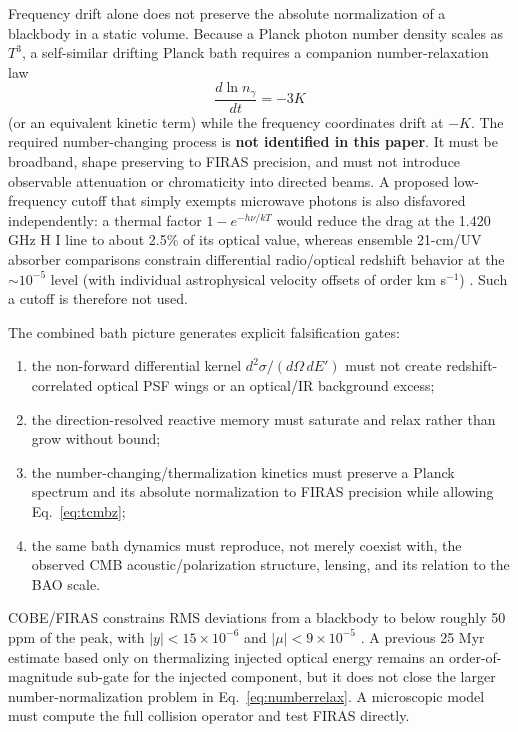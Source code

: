\documentclass[11pt]{article}
\begin{document}
Frequency drift alone does not preserve the absolute normalization of a blackbody in a static volume. Because a Planck photon number density scales as $T^3$, a self-similar drifting Planck bath requires a companion number-relaxation law
\begin{equation}
 \frac{d\ln n_\gamma}{dt}=-3K
 \label{eq:numberrelax}
\end{equation}
(or an equivalent kinetic term) while the frequency coordinates drift at $-K$. The required number-changing process is \textbf{not identified in this paper}. It must be broadband, shape preserving to FIRAS precision, and must not introduce observable attenuation or chromaticity into directed beams. A proposed low-frequency cutoff that simply exempts microwave photons is also disfavored independently: a thermal factor $1-e^{-h\nu/kT}$ would reduce the drag at the 1.420 GHz H I line to about 2.5\% of its optical value, whereas ensemble 21-cm/UV absorber comparisons constrain differential radio/optical redshift behavior at the $\sim10^{-5}$ level (with individual astrophysical velocity offsets of order km s$^{-1}$) \citep{Tzanavaris2007}. Such a cutoff is therefore not used.

The combined bath picture generates explicit falsification gates:
\begin{enumerate}[label=(\roman*)]
\item the non-forward differential kernel $d^2\sigma/(d\Omega\,dE')$ must not create redshift-correlated optical PSF wings or an optical/IR background excess;
\item the direction-resolved reactive memory must saturate and relax rather than grow without bound;
\item the number-changing/thermalization kinetics must preserve a Planck spectrum and its absolute normalization to FIRAS precision while allowing Eq.~\eqref{eq:tcmbz};
\item the same bath dynamics must reproduce, not merely coexist with, the observed CMB acoustic/polarization structure, lensing, and its relation to the BAO scale.
\end{enumerate}

COBE/FIRAS constrains RMS deviations from a blackbody to below roughly 50 ppm of the peak, with $|y|<15\times10^{-6}$ and $|\mu|<9\times10^{-5}$ \citep{Fixsen1996}. A previous 25 Myr estimate based only on thermalizing injected optical energy remains an order-of-magnitude sub-gate for the injected component, but it does not close the larger number-normalization problem in Eq.~\eqref{eq:numberrelax}. A microscopic model must compute the full collision operator and test FIRAS directly.
\end{document}
